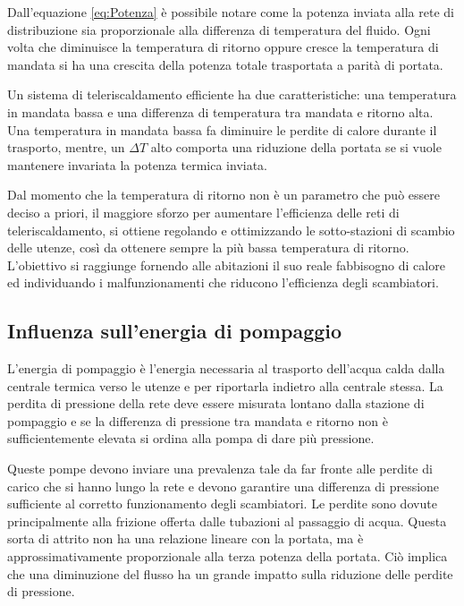 \documentclass[laurea,oneside,11pt]{USiena_tesiLM}
\begin{document}
Dall'equazione \ref{eq:Potenza} è possibile notare come la potenza inviata alla rete di distribuzione sia proporzionale alla differenza di temperatura del fluido. Ogni volta che diminuisce la temperatura di ritorno oppure cresce la temperatura di mandata si ha una crescita della potenza totale trasportata a parità di portata.

Un sistema di teleriscaldamento efficiente ha due caratteristiche: una temperatura in mandata bassa e una differenza di temperatura tra mandata e ritorno alta. Una temperatura in mandata bassa fa diminuire le perdite di calore durante il trasporto, mentre, un $\Delta T$ alto comporta una riduzione della portata se si vuole mantenere invariata la potenza termica inviata.

Dal momento che la temperatura di ritorno non è un parametro che può essere deciso a priori, il maggiore sforzo per aumentare l'efficienza delle reti di teleriscaldamento, si ottiene regolando e ottimizzando le sotto-stazioni di scambio delle utenze, così da ottenere sempre la più bassa temperatura di ritorno. L'obiettivo si raggiunge fornendo alle abitazioni il suo reale fabbisogno di calore ed individuando i malfunzionamenti che riducono l'efficienza degli scambiatori. 
\subsection{Influenza sull'energia di pompaggio}
L'energia di pompaggio è l'energia necessaria al trasporto dell'acqua calda dalla centrale termica verso le utenze e per riportarla indietro alla centrale stessa. La perdita di pressione della rete deve essere misurata lontano dalla stazione di pompaggio e se la differenza di pressione tra mandata e ritorno non è sufficientemente elevata si ordina alla pompa di dare più pressione.

Queste pompe devono inviare una prevalenza tale da far fronte alle perdite di carico che si hanno lungo la rete e devono garantire una differenza di pressione sufficiente al corretto funzionamento degli scambiatori. Le perdite sono dovute principalmente alla frizione offerta dalle tubazioni al passaggio di acqua. Questa sorta di attrito non ha una relazione lineare con la portata, ma è approssimativamente proporzionale alla terza potenza della portata. Ciò implica che una diminuzione del flusso ha un grande impatto sulla riduzione delle perdite di pressione.
\end{document}
